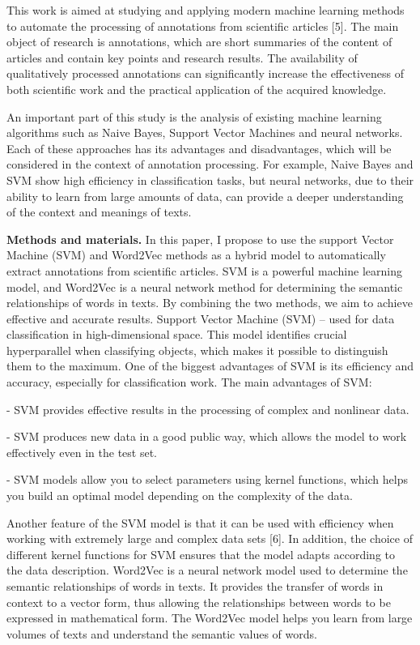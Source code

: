 \documentclass[
]{article}
\begin{document}
This work is aimed at studying and applying modern machine learning
methods to automate the processing of annotations from scientific
articles {[}5{]}. The main object of research is annotations, which are
short summaries of the content of articles and contain key points and
research results. The availability of qualitatively processed
annotations can significantly increase the effectiveness of both
scientific work and the practical application of the acquired knowledge.

An important part of this study is the analysis of existing machine
learning algorithms such as Naive Bayes, Support Vector Machines and
neural networks. Each of these approaches has its advantages and
disadvantages, which will be considered in the context of annotation
processing. For example, Naive Bayes and SVM show high efficiency in
classification tasks, but neural networks, due to their ability to learn
from large amounts of data, can provide a deeper understanding of the
context and meanings of texts.

\textbf{Methods and materials.} In this paper, I propose to use the
support Vector Machine (SVM) and Word2Vec methods as a hybrid model to
automatically extract annotations from scientific articles. SVM is a
powerful machine learning model, and Word2Vec is a neural network method
for determining the semantic relationships of words in texts. By
combining the two methods, we aim to achieve effective and accurate
results. Support Vector Machine (SVM) -- used for data classification in
high-dimensional space. This model identifies crucial hyperparallel when
classifying objects, which makes it possible to distinguish them to the
maximum. One of the biggest advantages of SVM is its efficiency and
accuracy, especially for classification work. The main advantages of
SVM:

- SVM provides effective results in the processing of complex and
nonlinear data.

- SVM produces new data in a good public way, which allows the model to
work effectively even in the test set.

- SVM models allow you to select parameters using kernel functions,
which helps you build an optimal model depending on the complexity of
the data.

Another feature of the SVM model is that it can be used with efficiency
when working with extremely large and complex data sets {[}6{]}. In
addition, the choice of different kernel functions for SVM ensures that
the model adapts according to the data description. Word2Vec is a neural
network model used to determine the semantic relationships of words in
texts. It provides the transfer of words in context to a vector form,
thus allowing the relationships between words to be expressed in
mathematical form. The Word2Vec model helps you learn from large volumes
of texts and understand the semantic values of words.
\end{document}
